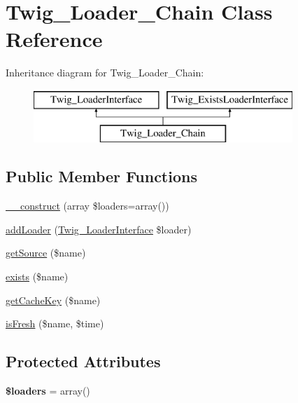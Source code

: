 \hypertarget{class_twig___loader___chain}{}\section{Twig\+\_\+\+Loader\+\_\+\+Chain Class Reference}
\label{class_twig___loader___chain}
Inheritance diagram for Twig\+\_\+\+Loader\+\_\+\+Chain\+:\begin{figure}[H]
\begin{center}
\leavevmode
\includegraphics[height=2.000000cm]{class_twig___loader___chain}
\end{center}
\end{figure}
\subsection*{Public Member Functions}
\begin{DoxyCompactItemize}
\item 
\hyperlink{class_twig___loader___chain_aa94b98a38dc6c45449a45212d47f1a95}{\+\_\+\+\_\+construct} (array \$loaders=array())
\item 
\hyperlink{class_twig___loader___chain_a7ad8b56cdbaec221cb1b1e2a991cda8c}{add\+Loader} (\hyperlink{interface_twig___loader_interface}{Twig\+\_\+\+Loader\+Interface} \$loader)
\item 
\hyperlink{class_twig___loader___chain_a8c6017d8ed0800a8d6b201883fcfb4bd}{get\+Source} (\$name)
\item 
\hyperlink{class_twig___loader___chain_a0909de156d39accf2e3c52f4bce3765f}{exists} (\$name)
\item 
\hyperlink{class_twig___loader___chain_aaf1587bcc7c8f06e87be6ccaf76fb6ea}{get\+Cache\+Key} (\$name)
\item 
\hyperlink{class_twig___loader___chain_a3ee0419b212dc4f6f1e8a5a615423ad8}{is\+Fresh} (\$name, \$time)
\end{DoxyCompactItemize}
\subsection*{Protected Attributes}
\begin{DoxyCompactItemize}
\item 
\hypertarget{class_twig___loader___chain_ade57fa58e6103ea68f43451f7232ec11}{}{\bfseries \$loaders} = array()\label{class_twig___loader___chain_ade57fa58e6103ea68f43451f7232ec11}

\end{DoxyCompactItemize}


